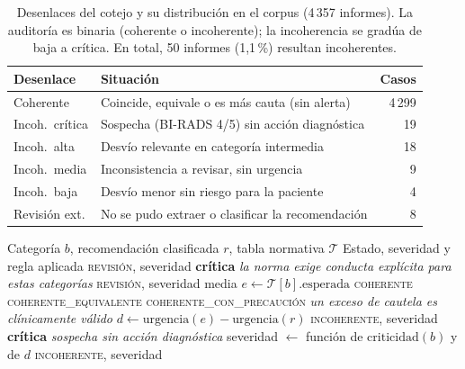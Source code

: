 \documentclass[10pt,journal,a4paper]{IEEEtran}
\begin{document}
\begin{table}[!t]
\caption{Desenlaces del cotejo y su distribuci\'on en el corpus (4\,357 informes). La auditor\'ia es binaria (coherente o incoherente); la incoherencia se grad\'ua de baja a cr\'itica. En total, 50 informes (1,1\,\%) resultan incoherentes.}
\label{tab:niveles}
\centering
\footnotesize
\begin{tabular}{@{}p{}p{}r@{}}
\toprule
\textbf{Desenlace} & \textbf{Situaci\'on} & \textbf{Casos} \\
\midrule
Coherente & Coincide, equivale o es m\'as cauta (sin alerta) & 4\,299 \\
Incoh.\ cr\'itica & Sospecha (BI-RADS 4/5) sin acci\'on diagn\'ostica & 19 \\
Incoh.\ alta & Desv\'io relevante en categor\'ia intermedia & 18 \\
Incoh.\ media & Inconsistencia a revisar, sin urgencia & 9 \\
Incoh.\ baja & Desv\'io menor sin riesgo para la paciente & 4 \\
Revisi\'on ext. & No se pudo extraer o clasificar la recomendaci\'on & 8 \\
\bottomrule
\end{tabular}
\end{table}

\begin{algorithm}[!t]
\caption{Cotejo de coherencia BI-RADS/ACR}
\label{alg:cotejo}
\begin{algorithmic}[1]
\Require Categor\'ia $b$, recomendaci\'on clasificada $r$, tabla normativa $\mathcal{T}$
\Ensure Estado, severidad y regla aplicada
 
    \State \Return \textsc{revisi\'on}, severidad \textbf{cr\'itica}
    \Statex \hfill \emph{la norma exige conducta expl\'icita para estas categor\'ias}
  \Else
    \State \Return \textsc{revisi\'on}, severidad media
  \EndIf
\EndIf
\State $e \gets \mathcal{T}[b].\text{esperada}$
  \State \Return \textsc{coherente}
  \State \Return \textsc{coherente\_equivalente}
  \State \Return \textsc{coherente\_con\_precauci\'on}
  \Statex \hfill \emph{un exceso de cautela es cl\'inicamente v\'alido}
\EndIf
\State $d \gets \mathrm{urgencia}(e) - \mathrm{urgencia}(r)$ 
  \State \Return \textsc{incoherente}, severidad \textbf{cr\'itica}
  \Statex \hfill \emph{sospecha sin acci\'on diagn\'ostica}
\EndIf
\State severidad $\gets$ funci\'on de $\mathrm{criticidad}(b)$ y de $d$
\State \Return \textsc{incoherente}, severidad
\end{algorithmic}
\end{algorithm}
\end{document}
